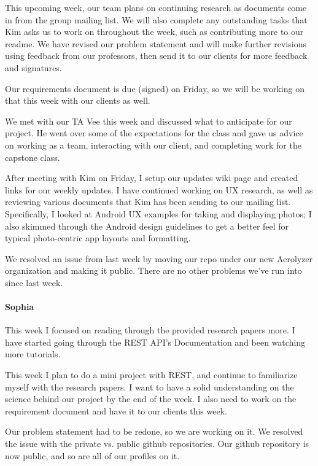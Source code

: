 \documentclass[onecolumn, draftclsnofoot,10pt, compsoc]{IEEEtran}
\begin{document}
\begin{flushleft}
This upcoming week, our team plans on continuing research as documents come in from the group mailing list. We will also complete any outstanding tasks that Kim asks us to work on throughout the week, such as contributing more to our readme. We have revised our problem statement and will make further revisions using feedback from our professors, then send it to our clients for more feedback and signatures.
 
Our requirements document is due (signed) on Friday, so we will be working on that this week with our clients as well.
 
 
We met with our TA Vee this week and discussed what to anticipate for our project. He went over some of the expectations for the class and gave us advice on working as a team, interacting with our client, and completing work for the capstone class.
 
After meeting with Kim on Friday, I setup our updates wiki page and created links for our weekly updates. I have continued working on UX research, as well as reviewing various documents that Kim has been sending to our mailing list. Specifically, I looked at Android UX examples for taking and displaying photos; I also skimmed through the Android design guidelines to get a better feel for typical photo-centric app layouts and formatting.
 
 
We resolved an issue from last week by moving our repo under our new Aerolyzer organization and making it public. There are no other problems we've run into since last week.
 
\paragraph{Sophia}
 
This week I focused on reading through the provided research papers more. I have started going through the REST API's Documentation and been watching more tutorials.
 
 
This week I plan to do a mini project with REST, and continue to familiarize myself with the research papers. I want to have a solid understanding on the science behind our project by the end of the week. I also need to work on the requirement document and have it to our clients this week.
 
 
Our problem statement had to be redone, so we are working on it. We resolved the issue with the private vs. public github repositories. Our github repository is now public, and so are all of our profiles on it.
 

\end{flushleft}
\end{document}
